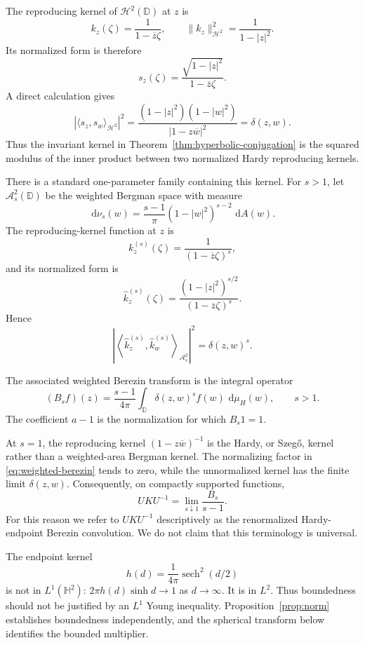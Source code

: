 \IfFileExists{iopjournal.cls}{\documentclass{iopjournal}}{\documentclass{iopjournal-draft}}
\theoremstyle{definition}
\theoremstyle{remark}
\newcommand{\D}{\mathbb D}
\newcommand{\dd}{\,\mathrm d}
\newcommand{\sech}{\operatorname{sech}}
\newcommand{\norm}[1]{\lVert #1\rVert}
\newcommand{\ip}[2]{\langle #1,#2\rangle}
\numberwithin{equation}{section}
\begin{document}
The reproducing kernel of $\mathcal H^2(\D)$ at $z$ is
\[
k_z(\zeta)=\frac1{1-\overline z\zeta},
\qquad
\norm{k_z}_{\mathcal H^2}^2
=
\frac1{1-|z|^2}.
\]
Its normalized form is therefore
\[
s_z(\zeta)
=
\frac{\sqrt{1-|z|^2}}{1-\overline z\zeta}.
\]
A direct calculation gives
\begin{equation}
	\left|
	\ip{s_z}{s_w}_{\mathcal H^2}
	\right|^2
	=
	\frac{(1-|z|^2)(1-|w|^2)}
	{|1-z\overline w|^2}
	=
	\delta(z,w).
	\label{eq:hardy-overlap1}
\end{equation}
Thus the invariant kernel in Theorem~\ref{thm:hyperbolic-conjugation}
is the squared modulus of the inner product between two normalized
Hardy reproducing kernels.






There is a standard one-parameter family containing this kernel.
For $s>1$, let $\mathcal A_s^2(\D)$ be the weighted Bergman space
with measure
\[
\dd\nu_s(w)
=
\frac{s-1}{\pi}(1-|w|^2)^{s-2}\,\dd A(w).
\]
The reproducing-kernel function at $z$ is
\[
k_z^{(s)}(\zeta)
=
\frac1{(1-\overline z\zeta)^s},
\]
and its normalized form is
\[
\widehat k_z^{(s)}(\zeta)
=
\frac{(1-|z|^2)^{s/2}}
{(1-\overline z\zeta)^s}.
\]
Hence
\[
\left|
\left\langle
\widehat k_z^{(s)},\widehat k_w^{(s)}
\right\rangle_{\mathcal A_s^2}
\right|^2
=
\delta(z,w)^s.
\]



The associated weighted Berezin transform is the integral operator
\begin{equation}
(B_sf)(z)
=
\frac{s-1}{4\pi}
\int_{\D}\delta(z,w)^s f(w)\,\dd\mu_H(w),
\qquad s>1.
	\label{eq:weighted-berezin}
\end{equation}
The coefficient $a-1$ is the normalization for which
$B_s 1=1$.

At $s=1$, the reproducing kernel
$(1-z\overline w)^{-1}$ is the Hardy, or Szeg\H{o}, kernel rather than
a weighted-area Bergman kernel.  The normalizing factor in
\eqref{eq:weighted-berezin} tends to zero, while the unnormalized
kernel has the finite limit $\delta(z,w)$.  Consequently, on compactly
supported functions,
\begin{equation}
	UKU^{-1}
	=
	\lim_{s\downarrow1}
	\frac{B_s}{s-1}.
	\label{eq:berezin-endpoint}
\end{equation}
For this reason we refer to $UKU^{-1}$ descriptively as the
renormalized Hardy-endpoint Berezin convolution.  We do not claim that
this terminology is universal.


The endpoint kernel
\[
 h(d)=\frac1{4\pi}\sech^2(d/2)
\]
is not in $L^1(\mathbb H^2)$: $2\pi h(d)\sinh d\to1$ as $d\to\infty$.  It is in $L^2$.  Thus boundedness should not be justified by an $L^1$ Young inequality.  Proposition~\ref{prop:norm} establishes boundedness independently, and the spherical transform below identifies the bounded multiplier.
\end{document}
